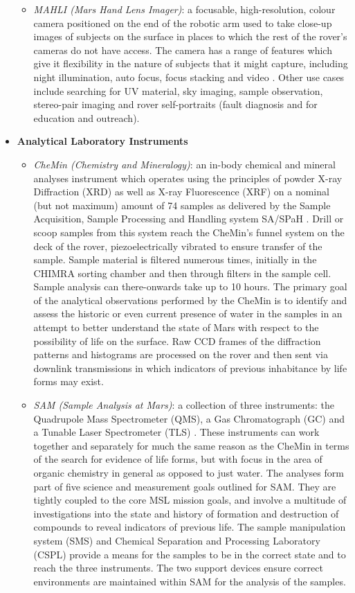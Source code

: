 \begin{itemize}
\begin{itemize}
            \item \textit{MAHLI (Mars Hand Lens Imager)}: a focusable, high-resolution, colour camera positioned on the end of the robotic arm used to take close-up images of subjects on the surface in places to which the rest of the rover's cameras do not have access. The camera has a range of features which give it flexibility in the nature of subjects that it might capture, including night illumination, auto focus, focus stacking and video \cite{mslsciencecornermahli}. Other use cases include searching for UV material, sky imaging, sample observation, stereo-pair imaging and rover self-portraits (fault diagnosis and for education and outreach).
          \end{itemize}
          \item \textbf{Analytical Laboratory Instruments}
          \begin{itemize}
            \item \textit{CheMin (Chemistry and Mineralogy)}: an in-body chemical and mineral analyses instrument which operates using the principles of powder X-ray Diffraction (XRD) as well as X-ray Fluorescence (XRF) on a nominal (but not maximum) amount of 74 samples as delivered by the Sample Acquisition, Sample Processing and Handling system SA/SPaH \cite{mslsciencecornerchemin}. Drill or scoop samples from this system reach the CheMin's funnel system on the deck of the rover, piezoelectrically vibrated to ensure transfer of the sample. Sample material is filtered numerous times, initially in the CHIMRA sorting chamber and then through filters in the sample cell. Sample analysis can there-onwards take up to 10 hours. The primary goal of the analytical observations performed by the CheMin is to identify and assess the historic or even current presence of water in the samples in an attempt to better understand the state of Mars with respect to the possibility of life on the surface. Raw CCD frames of the diffraction patterns and histograms are processed on the rover and then sent via downlink transmissions in which indicators of previous inhabitance by life forms may exist.
            \item \textit{SAM (Sample Analysis at Mars)}: a collection of three instruments: the Quadrupole Mass Spectrometer (QMS), a Gas Chromatograph (GC) and a Tunable Laser Spectrometer (TLS) \cite{mslsciencecornersam}. These instruments can work together and separately for much the same reason as the CheMin in terms of the search for evidence of life forms, but with focus in the area of organic chemistry in general as opposed to just water. The analyses form part of five science and measurement goals outlined for SAM. They are tightly coupled to the core MSL mission goals, and involve a multitude of investigations into the state and history of formation and destruction of compounds to reveal indicators of previous life. The sample manipulation system (SMS) and Chemical Separation and Processing Laboratory (CSPL) provide a means for the samples to be in the correct state and to reach the three instruments. The two support devices ensure correct environments are maintained within SAM for the analysis of the samples.

\end{itemize}
\end{itemize}
